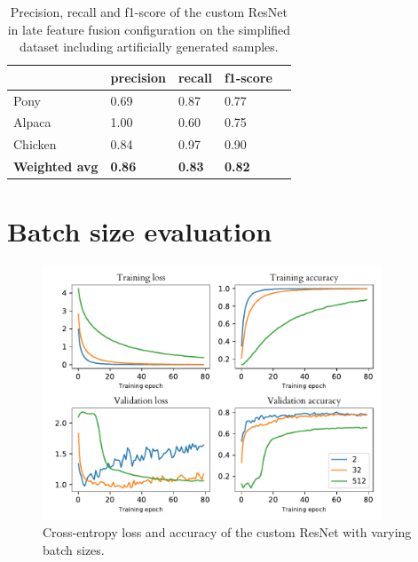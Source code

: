 \documentclass{l4proj}
\begin{document}
\begin{appendices}
\begin{table}[H]
  \centering
  \begin{tabular}{@{}lllll@{}}
  \toprule
                        & \textbf{precision} & \textbf{recall} & \textbf{f1-score} &  \\ \midrule
  Pony                  & 0.69               & 0.87            & 0.77              &  \\
  Alpaca                & 1.00               & 0.60            & 0.75              &  \\
  Chicken               & 0.84               & 0.97            & 0.90              &  \\
  \midrule
  \textbf{Weighted avg} & \textbf{0.86}      & \textbf{0.83}   & \textbf{0.82}     &  \\ \bottomrule
  \end{tabular}
  \caption{Precision, recall and f1-score of the custom ResNet in late feature fusion configuration on the simplified dataset including artificially generated samples.}
  \label{table:auto_scores_auto}
\end{table}


\chapter{Batch size evaluation}
\label{appendix_batch_size}

\begin{figure}[ht]
  \centering
  \includegraphics[width=0.9\textwidth]{images/evaluation/batch_size/history}
  \caption{Cross-entropy loss and accuracy of the custom ResNet with varying batch sizes.}
  \label{fig:batch_size}
\end{figure}


\end{appendices}
\end{document}
